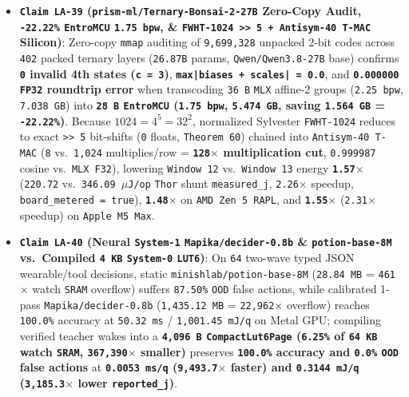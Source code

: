 \documentclass[10pt]{article}
\begin{document}
\begin{itemize}
  \item \textbf{\texttt{Claim LA-39} (\texttt{prism-ml/Ternary-Bonsai-2-27B} Zero-Copy Audit, \texttt{-22.22\%} \texttt{EntroMCU} \texttt{1.75 bpw}, \& \texttt{FWHT-1024 >> 5 + Antisym-40 T-MAC} Silicon)}: Zero-copy \texttt{mmap} auditing of \texttt{9,699,328} unpacked 2-bit codes across \texttt{402} packed ternary layers (\texttt{26.87B} params, \texttt{Qwen/Qwen3.8-27B} base) confirms \textbf{\texttt{0} invalid 4th states (\texttt{c = 3})}, \textbf{\texttt{max|biases + scales| = 0.0}}, and \textbf{\texttt{0.000000} \texttt{FP32} roundtrip error} when transcoding \texttt{36 B} \texttt{MLX} affine-2 groups (\texttt{2.25 bpw}, \texttt{7.038 GB}) into \textbf{\texttt{28 B} \texttt{EntroMCU} (\texttt{1.75 bpw}, \texttt{5.474 GB}, saving \texttt{1.564 GB} = \texttt{-22.22\%})}. Because $1024 = 4^5 = 32^2$, normalized Sylvester \texttt{FWHT-1024} reduces to exact \texttt{>> 5} bit-shifts (\texttt{0} floats, \texttt{Theorem 60}) chained into \texttt{Antisym-40 T-MAC} (\texttt{8} vs.\ \texttt{1,024} multiplies/row = \textbf{\texttt{128$\times$} multiplication cut}, \texttt{0.999987} cosine vs.\ \texttt{MLX F32}), lowering \texttt{Window 12} vs.\ \texttt{Window 13} energy \textbf{\texttt{1.57$\times$}} (\texttt{220.72} vs.\ \texttt{346.09 $\mu$J/op} \texttt{Thor} shunt \texttt{measured\_j}, \texttt{2.26$\times$} speedup, \texttt{board\_metered = true}), \textbf{\texttt{1.48$\times$}} on \texttt{AMD Zen 5 RAPL}, and \textbf{\texttt{1.55$\times$}} (\texttt{2.31$\times$} speedup) on \texttt{Apple M5 Max}.
  \item \textbf{\texttt{Claim LA-40} (Neural \texttt{System-1} \texttt{Mapika/decider-0.8b} \& \texttt{potion-base-8M} vs.\ Compiled \texttt{4 KB} \texttt{System-0} \texttt{LUT6})}: On \texttt{64} two-wave typed JSON wearable/tool decisions, static \texttt{minishlab/potion-base-8M} (\texttt{28.84 MB} = \texttt{461$\times$} watch \texttt{SRAM} overflow) suffers \texttt{87.50\%} \texttt{OOD} false actions, while calibrated 1-pass \texttt{Mapika/decider-0.8b} (\texttt{1,435.12 MB} = \texttt{22,962$\times$} overflow) reaches \texttt{100.0\%} accuracy at \texttt{50.32 ms} / \texttt{1,001.45 mJ/q} on Metal GPU; compiling verified teacher wakes into a \textbf{\texttt{4,096 B} \texttt{CompactLut6Page} (\texttt{6.25\%} of \texttt{64 KB} watch \texttt{SRAM}, \texttt{367,390$\times$} smaller)} preserves \textbf{\texttt{100.0\%} accuracy and \texttt{0.0\%} \texttt{OOD} false actions} at \textbf{\texttt{0.0053 ms/q} (\texttt{9,493.7$\times$} faster) and \texttt{0.3144 mJ/q} (\texttt{3,185.3$\times$} lower \texttt{reported\_j})}.

\end{itemize}
\end{document}
